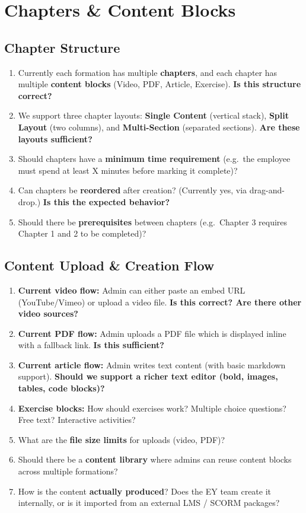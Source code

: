 \documentclass[11pt,a4paper]{article}
\begin{document}
\section{Chapters \& Content Blocks}

\subsection{Chapter Structure}
\begin{enumerate}[leftmargin=2em]
  \item Currently each formation has multiple \textbf{chapters}, and each chapter has multiple \textbf{content blocks} (Video, PDF, Article, Exercise). \textbf{Is this structure correct?}
  \item We support three chapter layouts: \textbf{Single Content} (vertical stack), \textbf{Split Layout} (two columns), and \textbf{Multi-Section} (separated sections). \textbf{Are these layouts sufficient?}
  \item Should chapters have a \textbf{minimum time requirement} (e.g.\ the employee must spend at least X minutes before marking it complete)?
  \item Can chapters be \textbf{reordered} after creation? (Currently yes, via drag-and-drop.) \textbf{Is this the expected behavior?}
  \item Should there be \textbf{prerequisites} between chapters (e.g.\ Chapter 3 requires Chapter 1 and 2 to be completed)?
\end{enumerate}

\subsection{Content Upload \& Creation Flow}
\begin{enumerate}[leftmargin=2em]
  \item \textbf{Current video flow:} Admin can either paste an embed URL (YouTube/Vimeo) or upload a video file. \textbf{Is this correct? Are there other video sources?}
  \item \textbf{Current PDF flow:} Admin uploads a PDF file which is displayed inline with a fallback link. \textbf{Is this sufficient?}
  \item \textbf{Current article flow:} Admin writes text content (with basic markdown support). \textbf{Should we support a richer text editor (bold, images, tables, code blocks)?}
  \item \textbf{Exercise blocks:} How should exercises work? Multiple choice questions? Free text? Interactive activities?
  \item What are the \textbf{file size limits} for uploads (video, PDF)?
  \item Should there be a \textbf{content library} where admins can reuse content blocks across multiple formations?
  \item How is the content \textbf{actually produced}? Does the EY team create it internally, or is it imported from an external LMS / SCORM packages?
\end{enumerate}
\end{document}
